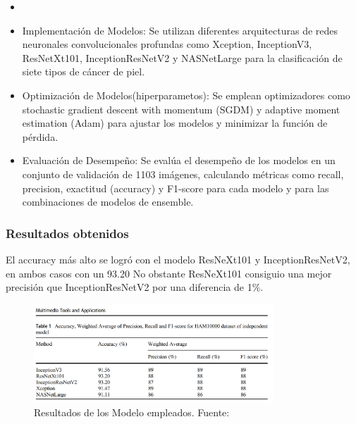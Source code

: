 \newcommand{\TUAMCtwo}{Implementación de Modelos: Se utilizan diferentes arquitecturas de redes neuronales convolucionales profundas como Xception, InceptionV3, ResNetXt101, InceptionResNetV2 y NASNetLarge para la clasificación de siete tipos de cáncer de piel. }

\newcommand{\TUAMCthree}{Optimización de Modelos(hiperparametos): Se emplean optimizadores como stochastic gradient descent with momentum (SGDM) y adaptive moment estimation (Adam) para ajustar los modelos y minimizar la función de pérdida.
}


\newcommand{\TUAMCfour}{Evaluación de Desempeño: Se evalúa el desempeño de los modelos en un conjunto de validación de 1103 imágenes, calculando métricas como recall, precision, exactitud (accuracy) y F1-score para cada modelo y para las combinaciones de modelos de ensemble.
	
}

\begin{itemize}
	\item \TUAMCone
	\item \TUAMCtwo
	\item \TUAMCthree
	\item \TUAMCfour
\end{itemize}

\subsubsection{Resultados obtenidos}

El accuracy más alto se logró con el modelo ResNeXt101 y InceptionResNetV2, en ambos casos con un 93.20%
No obstante ResNeXt101 consiguio una mejor precisión que InceptionResNetV2 por una diferencia de 1\%.

\begin{figure}[h]
	\begin{center}
		\includegraphics[width=0.8\textwidth]{2/figuras/An_improved_network_skin_cancer_classification_imagen_01.png}
		\caption{Resultados de los Modelo empleados. Fuente: \cite{chaturvedi2020multi}}
		\label{1:fig}
	\end{center}
\end{figure}





